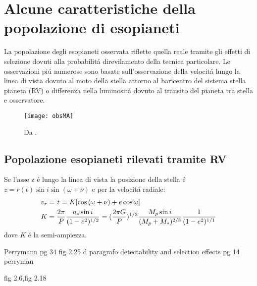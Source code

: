 {\let\clearpage\relax\let\cleardoublepage\relax
\chapter{Alcune caratteristiche della popolazione di esopianeti}
}

La popolazione degli esopianeti osservata riflette quella reale tramite gli effetti di selezione dovuti alla probabilit\'a direvilamento della tecnica particolare. Le osservazioni pi\'u numerose sono basate sull'osservazione della velocit\'a lungo la linea di vista dovuto al moto della stella attorno al baricentro del sistema stella pianeta (RV) o differenza nella luminosit\'a dovuto al transito del pianeta tra stella e osservatore.

\begin{figure}[!ht]
\texttt{[image: obsMA]}\label{fig:Maplot}
\caption{Da \cite{mordasini2018}.}
\end{figure}

\section{Popolazione esopianeti rilevati tramite RV}

Se l'asse z \'e lungo la linea di vista la posizione della stella \'e $z=r(t)\sin{i}\sin{(\omega+\nu)}$ e per la velocit\'a radiale:
\begin{align}
&v_r=\dot{z}=K[\cos{(\omega+\nu)}+e\cos{\omega}]\label{eq:vrsignal}\\
&K=\frac{2\pi}{P}\frac{a_*\sin{i}}{(1-e^2)^{1/2}}=(\frac{2\pi G}{P})^{1/3}\frac{M_p\sin{i}}{(M_p+M_*)^{2/3}}\frac{1}{(1-e^2)^{1/1}}
\end{align}
dove $K$ \'e la semi-ampiezza.

\begin{workout}
Perrymann pg 34 fig 2.25 d
paragrafo detectability and selection effects pg 14 perryman
\end{workout}

\begin{workout}
fig 2.6,fig 2.18
\end{workout}


